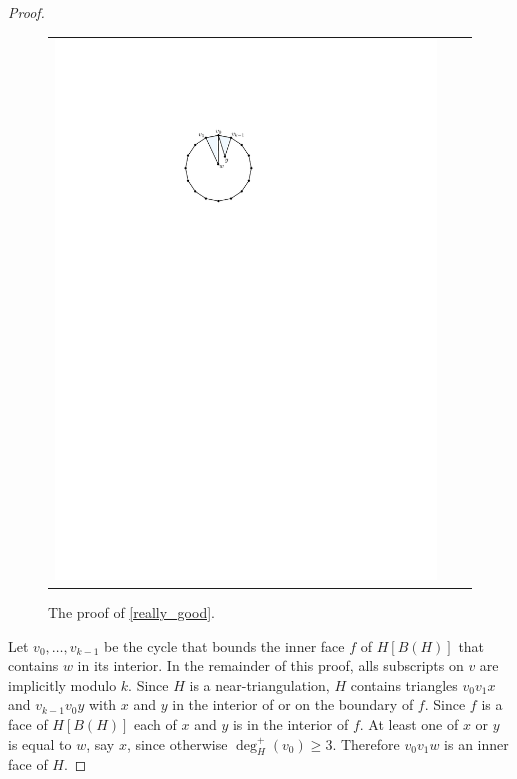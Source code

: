 \documentclass{article}
\theoremstyle{definition}
\begin{document}
\begin{proof}
\begin{figure}
\begin{tabular}{ccc}
      \includegraphics[page=3]{figs/really_good}
    \end{tabular}
    \caption{The proof of \cref{really_good}.
    }
    \label{really_good_fig}
  \end{figure}

  Let $v_0,\ldots,v_{k-1}$ be the cycle that bounds the inner face $f$ of $H[B(H)]$ that contains $w$ in its interior. In the remainder of this proof, alls subscripts on $v$ are implicitly modulo $k$.  Since $H$ is a near-triangulation, $H$ contains triangles $v_0v_1x$ and $v_{k-1}v_0 y$ with $x$ and $y$ in the interior of or on the boundary of $f$.  Since $f$ is a face of $H[B(H)]$ each of $x$ and $y$ is in the interior of $f$.  At least one of $x$ or $y$ is equal to $w$, say $x$, since otherwise $\deg^+_H(v_0)\ge 3$.  Therefore $v_0v_1 w$ is an inner face of $H$.


\end{proof}
\end{document}
